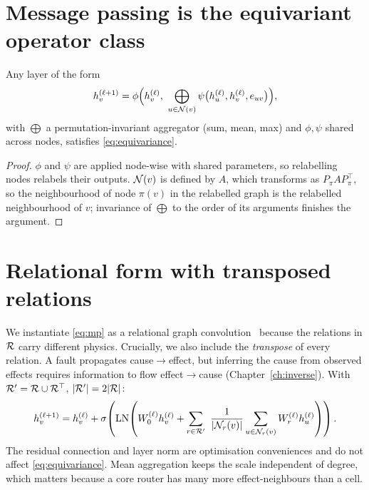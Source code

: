 \section{Message passing is the equivariant operator class}
\begin{proposition}
Any layer of the form
\begin{equation}
h_v^{(\ell+1)}=\phi\Big(h_v^{(\ell)},\ \bigoplus_{u\in\N(v)}\psi\big(h_u^{(\ell)},h_v^{(\ell)},e_{uv}\big)\Big),
\label{eq:mp}
\end{equation}
with $\bigoplus$ a permutation-invariant aggregator (sum, mean, max) and $\phi,\psi$ shared across
nodes, satisfies \eqref{eq:equivariance}.
\end{proposition}
\begin{proof}
$\phi$ and $\psi$ are applied node-wise with shared parameters, so relabelling nodes relabels their
outputs. $\mathcal{N}(v)$ is defined by $A$, which transforms as $P_\pi A P_\pi^\top$, so the neighbourhood
of node $\pi(v)$ in the relabelled graph is the relabelled neighbourhood of $v$; invariance of
$\bigoplus$ to the order of its arguments finishes the argument.
\end{proof}

\section{Relational form with transposed relations}
We instantiate \eqref{eq:mp} as a relational graph convolution~\cite{schlichtkrull2018} because
the relations in $\mathcal{R}$ carry different physics. Crucially, we also include the \emph{transpose} of
every relation. A fault propagates cause$\to$effect, but inferring the cause from observed effects
requires information to flow effect$\to$cause (Chapter~\ref{ch:inverse}). With
$\mathcal{R}'=\mathcal{R}\cup\mathcal{R}^{\top}$, $|\mathcal{R}'|=2|\mathcal{R}|$:
\begin{equation}
h_v^{(\ell+1)}=h_v^{(\ell)}+\sigma\!\left(\mathrm{LN}\!\left(W_0^{(\ell)}h_v^{(\ell)}+\sum_{r\in\Rel'}\ \frac{1}{|\N_r(v)|}\sum_{u\in\N_r(v)}W_r^{(\ell)}h_u^{(\ell)}\right)\right).
\label{eq:rgcn}
\end{equation}
The residual connection and layer norm are optimisation conveniences and do not affect
\eqref{eq:equivariance}. Mean aggregation keeps the scale independent of degree, which matters
because a core router has many more effect-neighbours than a cell.

